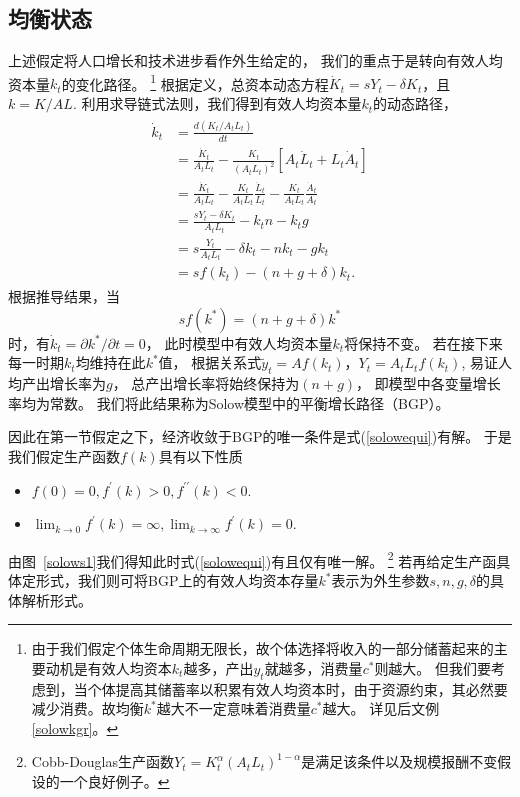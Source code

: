 \documentclass[cn,normal,11pt,black]{elegantnote}
\begin{document}
\subsection{均衡状态}

上述假定将人口增长和技术进步看作外生给定的，
我们的重点于是转向有效人均资本量$k_t$的变化路径。
            \footnote{
    由于我们假定个体生命周期无限长，故个体选择将收入的一部分储蓄起来的主要动机是有效人均资本$k_t$越多，产出$y_t$就越多，消费量$c^*$则越大。
    但我们要考虑到，当个体提高其储蓄率以积累有效人均资本时，由于资源约束，其必然要减少消费。故均衡$k^*$越大不一定意味着消费量$c^*$越大。
        详见后文例\ref{solowkgr}。}
根据定义，总资本动态方程$\dot{K}_t = s Y_t-\delta K_t$，且$k=K/AL$.
利用求导链式法则，我们得到有效人均资本量$k_t$的动态路径，
\begin{align}
  \begin{aligned}
        \dot{k}_t & = \frac{d \left(K_t / A_t L_t \right)}{d t} \\
                  & = \frac{\dot{K}_t}{A_t L_t}-\frac{K_t}{(A_t L_t)^{2}}[A_t \dot{L}_t+L_t \dot{A}_t] \\
                  & = \frac{\dot{K}_t}{A_t L_t}-\frac{K_t}{A_t L_t} \frac{\dot{L}_t}{L_t}-
                            \frac{K_t}{A_t L_t} \frac{\dot{A}_t}{A_t} \\
                  & = \frac{s Y_t-\delta K_t}{A_t L_t}-k_t n-k_t g \\
                  & = s \frac{Y_t}{A_t L_t}-\delta k_t-n k_t-g k_t \\
                  & = sf(k_t) - (n+g+\delta)k_t .
  \end{aligned}
\end{align}
根据推导结果，当
    \begin{equation}\label{solowequi}
       sf(k^*) = (n+g+\delta)k^*  
    \end{equation}
时，有$\dot{k}_t = \partial k^* / \partial t = 0$，
此时模型中有效人均资本量$k_t$将保持不变。
若在接下来每一时期$k_t$均维持在此$k^*$值，
根据关系式$\tilde{y}_t = Af(k_t)$，$Y_t=A_tL_tf(k_t)$,
易证人均产出增长率为$g$，
总产出增长率将始终保持为$(n+g)$，
即模型中各变量增长率均为常数。
我们将此结果称为Solow模型中的平衡增长路径（BGP）。


因此在第一节假定之下，经济收敛于BGP的唯一条件是式(\ref{solowequi})有解。
于是我们假定生产函数$f(k)$具有以下性质
\begin{itemize}
    \item $f(0)=0, f^\prime(k)>0, f^{\prime \prime}(k)<0.$ 
    \item $\lim_{k \to 0} f^\prime(k)=\infty, \lim_{k \to \infty} f^\prime(k)=0.$
\end{itemize}
    由图~\ref{solows1}我们得知此时式(\ref{solowequi})有且仅有唯一解。
    \footnote{Cobb-Douglas生产函数$Y_t = K_t^\alpha (A_tL_t)^{1-\alpha}$是满足该条件以及规模报酬不变假设的一个良好例子。}
    若再给定生产函具体定形式，我们则可将BGP上的有效人均资本存量$k^*$表示为外生参数$s,n,g,\delta$的具体解析形式。
\end{document}
